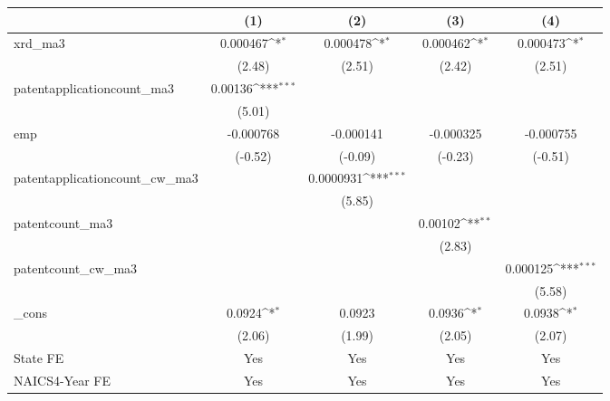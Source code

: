 {
\def\sym#1{\ifmmode^{#1}\else\(^{#1}\)\fi}
\begin{tabular}{l*{4}{c}}
\hline\hline
            &\multicolumn{1}{c}{(1)}         &\multicolumn{1}{c}{(2)}         &\multicolumn{1}{c}{(3)}         &\multicolumn{1}{c}{(4)}         \\
\hline
xrd\_ma3     &    0.000467\sym{*}  &    0.000478\sym{*}  &    0.000462\sym{*}  &    0.000473\sym{*}  \\
            &      (2.48)         &      (2.51)         &      (2.42)         &      (2.51)         \\
[1em]
patentapplicationcount\_ma3&     0.00136\sym{***}&                     &                     &                     \\
            &      (5.01)         &                     &                     &                     \\
[1em]
emp         &   -0.000768         &   -0.000141         &   -0.000325         &   -0.000755         \\
            &     (-0.52)         &     (-0.09)         &     (-0.23)         &     (-0.51)         \\
[1em]
patentapplicationcount\_cw\_ma3&                     &   0.0000931\sym{***}&                     &                     \\
            &                     &      (5.85)         &                     &                     \\
[1em]
patentcount\_ma3&                     &                     &     0.00102\sym{**} &                     \\
            &                     &                     &      (2.83)         &                     \\
[1em]
patentcount\_cw\_ma3&                     &                     &                     &    0.000125\sym{***}\\
            &                     &                     &                     &      (5.58)         \\
[1em]
\_cons      &      0.0924\sym{*}  &      0.0923         &      0.0936\sym{*}  &      0.0938\sym{*}  \\
            &      (2.06)         &      (1.99)         &      (2.05)         &      (2.07)         \\
[1em]
State FE    &         Yes         &         Yes         &         Yes         &         Yes         \\
[1em]
NAICS4-Year FE&         Yes         &         Yes         &         Yes         &         Yes         \\

\end{tabular}}
